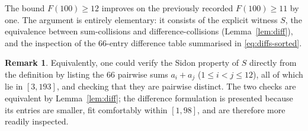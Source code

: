 \documentclass[a4paper,11pt]{amsart}
\theoremstyle{plain}
\theoremstyle{definition}
\newtheorem{remark}[theorem]{Remark}
\begin{document}
The bound $F(100)\geq 12$ improves on the previously recorded
$F(100)\geq 11$ by one. The argument is entirely elementary: it consists
of the explicit witness $S$, the equivalence between sum\nobreakdash-collisions
and difference\nobreakdash-collisions (Lemma~\ref{lem:diff}), and the
inspection of the $66$\nobreakdash-entry difference table summarised in
\eqref{eq:diffs-sorted}.

\begin{remark}
Equivalently, one could verify the Sidon property of $S$ directly from
the definition by listing the $66$ pairwise sums $a_i+a_j$
($1\leq i<j\leq 12$), all of which lie in $[3,193]$, and checking that
they are pairwise distinct. The two checks are equivalent by
Lemma~\ref{lem:diff}; the difference formulation is presented because
its entries are smaller, fit comfortably within $[1,98]$, and are
therefore more readily inspected.
\end{remark}
\end{document}
